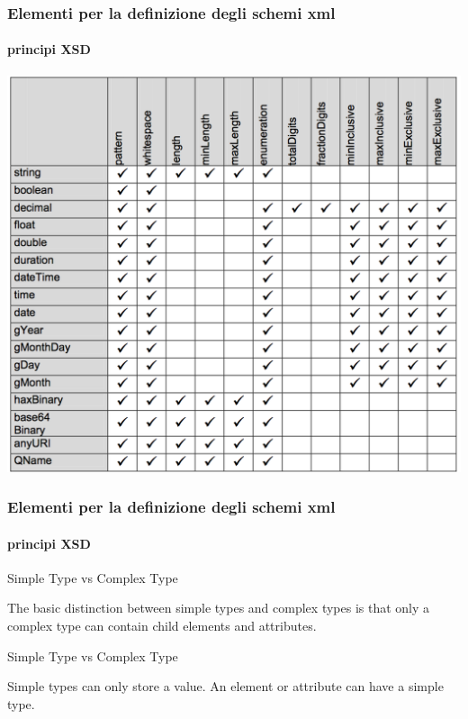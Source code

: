 \begin{frame}
	\frametitle{Elementi per la definizione degli schemi xml}
	\framesubtitle{principi XSD}
	\addtocounter{nframe}{1}

	\begin{center}
		\includegraphics[width=.8\textwidth]{imgs/SchemaDataTypeFacets.png}
	\end{center}

\end{frame}


\begin{frame}
	\frametitle{Elementi per la definizione degli schemi xml}
	\framesubtitle{principi XSD}
	\addtocounter{nframe}{1}

	\begin{block}{Simple Type vs Complex Type}

		The basic distinction between simple types and complex types is that only a complex type can contain child elements and attributes.

	\end{block}

	\begin{block}{Simple Type vs Complex Type}

		Simple types can only store a value. An element or attribute can have a simple type.

	\end{block}

\end{frame}



